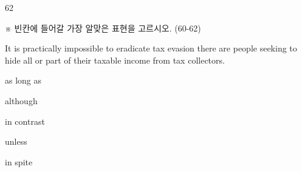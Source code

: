 \begin{question}{62}
\begin{framedtext}
※ 빈칸에 들어갈 가장 알맞은 표현을 고르시오. (60-62) \par
\end{framedtext}
It is practically impossible to eradicate tax evasion \blank{} there are people seeking to hide all or part of their taxable income from tax collectors.
\begin{choices}
  \item as long as
  \item although
  \item in contrast
  \item unless
  \item in spite
\end{choices}
\end{question}
